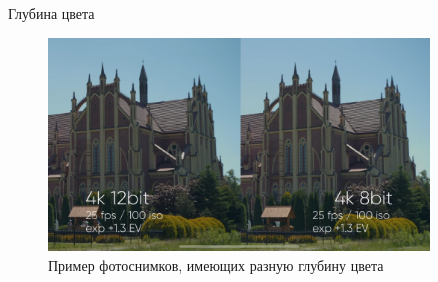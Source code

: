 \documentclass{beamer}
\begin{document}
	\begin{frame}{Глубина цвета}
		\begin{figure}
			\includegraphics[width=0.9\textwidth]{images/HDR_COMPARISON.png}
			\caption{
				Пример фотоснимков, имеющих разную глубину цвета
				}
		\end{figure}

	\end{frame}
\end{document}
